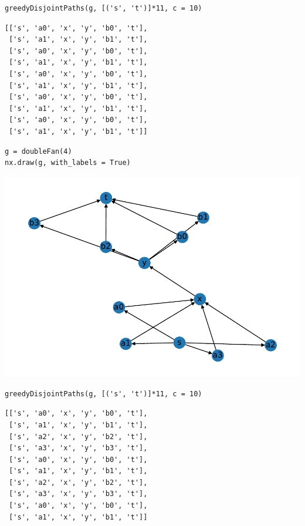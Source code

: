 \begin{verbatim}
greedyDisjointPaths(g, [('s', 't')]*11, c = 10)
\end{verbatim}
\begin{verbatim}
[['s', 'a0', 'x', 'y', 'b0', 't'],
 ['s', 'a1', 'x', 'y', 'b1', 't'],
 ['s', 'a0', 'x', 'y', 'b0', 't'],
 ['s', 'a1', 'x', 'y', 'b1', 't'],
 ['s', 'a0', 'x', 'y', 'b0', 't'],
 ['s', 'a1', 'x', 'y', 'b1', 't'],
 ['s', 'a0', 'x', 'y', 'b0', 't'],
 ['s', 'a1', 'x', 'y', 'b1', 't'],
 ['s', 'a0', 'x', 'y', 'b0', 't'],
 ['s', 'a1', 'x', 'y', 'b1', 't']]
\end{verbatim}



\begin{verbatim}
g = doubleFan(4)
nx.draw(g, with_labels = True)
\end{verbatim}
\includegraphics[width=0.5 \linewidth]{labs/figures/lab1_figure9_1.pdf}



\begin{verbatim}
greedyDisjointPaths(g, [('s', 't')]*11, c = 10)
\end{verbatim}
\begin{verbatim}
[['s', 'a0', 'x', 'y', 'b0', 't'],
 ['s', 'a1', 'x', 'y', 'b1', 't'],
 ['s', 'a2', 'x', 'y', 'b2', 't'],
 ['s', 'a3', 'x', 'y', 'b3', 't'],
 ['s', 'a0', 'x', 'y', 'b0', 't'],
 ['s', 'a1', 'x', 'y', 'b1', 't'],
 ['s', 'a2', 'x', 'y', 'b2', 't'],
 ['s', 'a3', 'x', 'y', 'b3', 't'],
 ['s', 'a0', 'x', 'y', 'b0', 't'],
 ['s', 'a1', 'x', 'y', 'b1', 't']]
\end{verbatim}

